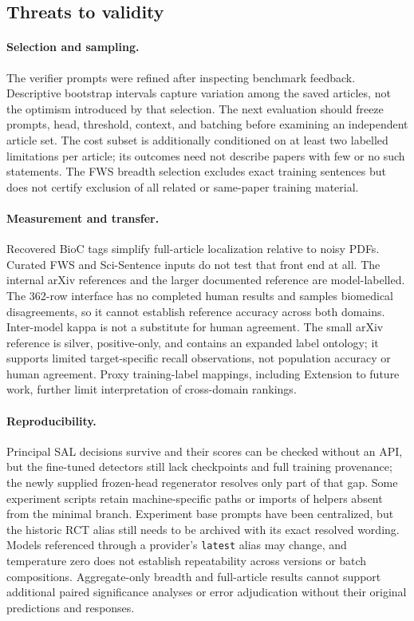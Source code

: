 \subsection{Threats to validity}

\paragraph{Selection and sampling.}
The verifier prompts were refined after inspecting benchmark feedback. Descriptive bootstrap
intervals capture variation among the saved articles, not the optimism introduced by that
selection. The next evaluation should freeze prompts, head, threshold, context, and batching before
examining an independent article set. The cost subset is additionally conditioned on at least two
labelled limitations per article; its outcomes need not describe papers with few or no such statements.
The FWS breadth selection excludes exact training sentences but does not certify exclusion of
all related or same-paper training material.

\paragraph{Measurement and transfer.}
Recovered BioC tags simplify full-article localization relative to noisy PDFs. Curated FWS and
Sci-Sentence inputs do not test that front end at all. The internal arXiv references and the larger documented reference are model-labelled.
The 362-row interface has no completed human results and samples biomedical disagreements,
so it cannot establish reference accuracy across both domains. Inter-model kappa is not a
substitute for human agreement. The small arXiv reference is silver,
positive-only, and contains an expanded label ontology; it supports limited target-specific
recall observations, not population accuracy or human agreement. Proxy training-label mappings,
including Extension to future work, further limit interpretation of cross-domain rankings.

\paragraph{Reproducibility.}
Principal SAL decisions survive and their scores can be checked without an API, but the fine-tuned detectors
still lack checkpoints and full training provenance; the newly supplied frozen-head regenerator
resolves only part of that gap. Some experiment scripts retain machine-specific paths or imports
of helpers absent from the minimal branch. Experiment base prompts have been centralized, but the historic RCT alias still needs to be
archived with its exact resolved wording. Models referenced through a provider's \texttt{latest}
alias may change, and temperature zero does not establish repeatability across versions or batch
compositions. Aggregate-only breadth and full-article results cannot support additional paired
significance analyses or error adjudication without their original predictions and responses.

